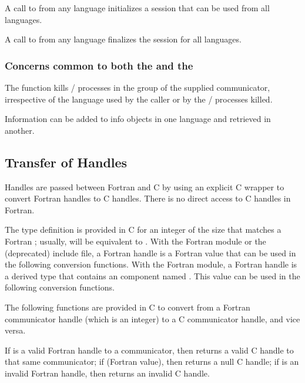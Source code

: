 A call to  from any language initializes a session that can be used from all languages.

A call to  from any language finalizes the session for all languages.

\subsubsection{Concerns common to both the \texorpdfstring{\wpm}{World Model}
and the \texorpdfstring{\spm}{Sessions Model}}

The function  kills \MPI/ processes in the group of the supplied communicator, irrespective of the language
used by the caller or by the \MPI/ processes killed.

Information can be added to info objects in one language and
retrieved in another.

\subsection{Transfer of Handles}
\label{sec:misc-handleconvert}

Handles are passed between
Fortran and C
by using an explicit C wrapper to convert
Fortran handles to C handles. There is no direct access to
C
handles in Fortran.

The type definition  is provided in
C for an
integer of the size that matches a Fortran ;
usually,  will be equivalent to
.
With the Fortran  module or the (deprecated)  include file,
a Fortran handle is a Fortran  value
that can be used in the following conversion functions.
With the Fortran  module,
a Fortran handle is a  derived type that contains
an  component named .
This  value
can be used in the following conversion functions.

The following functions are provided in C to convert from a
Fortran communicator handle (which is an integer) to a C communicator handle, and vice versa.


If  is a valid Fortran handle to a communicator,
then  returns a valid C handle to that same
communicator;
if \mpicode{ = } (Fortran value), then
 returns a null C handle; if 
is an invalid Fortran handle, then 
returns an invalid C handle.

